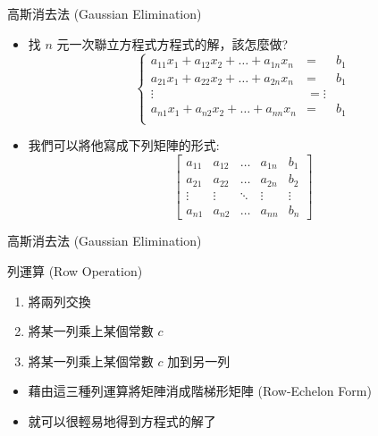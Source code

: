 \documentclass[aspectratio=169]{beamer}
\begin{document}
\begin{frame}{高斯消去法 (Gaussian Elimination)}
    \begin{itemize}
        \item<1-> 找 $n$ 元一次聯立方程式方程式的解，該怎麼做?
        \begin{equation*}
            \left\{
                \begin{matrix}
                    a_{11}x_1 + a_{12}x_2 + \dots + a_{1n}x_n &=& b_1\\
                    a_{21}x_1 + a_{22}x_2 + \dots + a_{2n}x_n &=& b_1\\
                    \vdots &= \vdots \\
                    a_{n1}x_1 + a_{n2}x_2 + \dots + a_{nn}x_n &=& b_1\\
                \end{matrix}
            \right.
        \end{equation*}
        \item<2-> 我們可以將他寫成下列矩陣的形式:
        \begin{equation*}
            \displaystyle \left[{
                \begin{array}{cccc|c}
                    a_{11} & a_{12} & \dots & a_{1n} & b_1 \\
                    a_{21} & a_{22} & \dots & a_{2n} & b_2 \\
                    \vdots & \vdots & \ddots & \vdots & \vdots \\
                    a_{n1} & a_{n2} & \dots & a_{nn} & b_n 
                \end{array}}\right]
        \end{equation*}
    \end{itemize}
\end{frame}

\begin{frame}{高斯消去法 (Gaussian Elimination)}
    \begin{alertblock}{列運算 (Row Operation)}
        \begin{enumerate}
            \item 將兩列交換
            \item 將某一列乘上某個常數 $c$
            \item 將某一列乘上某個常數 $c$ 加到另一列
        \end{enumerate}
    \end{alertblock}
    \begin{itemize}
        \item 藉由這三種列運算將矩陣消成階梯形矩陣 (Row-Echelon Form)
        \item 就可以很輕易地得到方程式的解了
    \end{itemize}
\end{frame}
\end{document}
